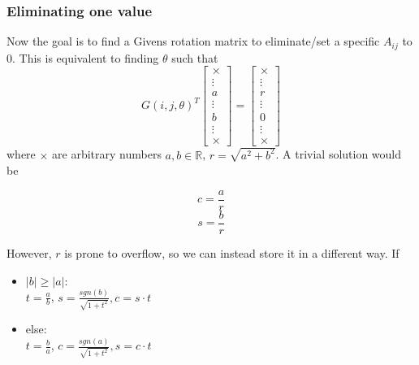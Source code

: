 \documentclass[a4paper]{scrartcl}
\begin{document}
        \subsubsection{Eliminating one value}
            Now the goal is to find a Givens rotation matrix to eliminate/set a
            specific $A_{ij}$ to 0. This is equivalent to finding $\theta$ such
            that
            \begin{equation}
                G(i,j,\theta)^T \begin{bmatrix} 
                    \times\\
                    \vdots\\
                    a\\
                    \vdots\\
                    b\\
                    \vdots\\
                    \times
                    \end{bmatrix}
                = \begin{bmatrix} 
                    \times\\
                    \vdots\\
                    r\\
                    \vdots\\
                    0\\
                    \vdots\\
                    \times
                    \end{bmatrix}
            \end{equation}
            where $\times$ are arbitrary numbers $a,b \in \mathbb{R}$, $r=\sqrt{a^2+b^2}$. 
            A trivial solution would be 
            \begin{multicols}{2}
                \begin{equation}
                    c = \frac{a}{r}
                \end{equation}\break
                \begin{equation}
                    s = \frac{b}{r}
                \end{equation}
            \end{multicols}
            However, $r$ is prone to overflow, so we can instead store it in a
            different way. If
            \begin{itemize}\label{eq:Givens_stable}
                \item $\lvert b \rvert \geq \lvert a \rvert$:\\
                    $t=\frac{a}{b}$, $s=\frac{sgn(b)}{\sqrt{1+t^2}}, c=s\cdot t$
                \item else:\\
                    $t=\frac{b}{a}$, $c=\frac{sgn(a)}{\sqrt{1+t^2}}, s=c\cdot t$
            \end{itemize}
\end{document}
